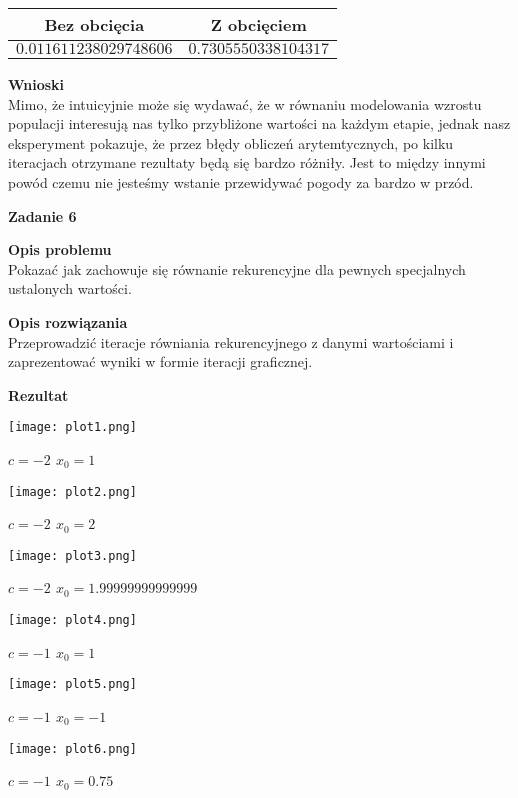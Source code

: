 \documentclass{article}
\begin{document}
\begin{center}
	\begin{tabular}{|c|c|}
		\hline
		Bez obcięcia           & Z obcięciem          \\
		\hline
		$0.011611238029748606$ & $0.7305550338104317$ \\
		\hline
	\end{tabular}
\end{center}

\pagebreak

\noindent \textbf{Wnioski} \\
Mimo, że intuicyjnie może się wydawać, że w równaniu modelowania wzrostu populacji
interesują nas tylko przybliżone wartości na każdym etapie, jednak nasz eksperyment
pokazuje, że przez błędy obliczeń arytemtycznych, po kilku iteracjach otrzymane rezultaty
będą się bardzo różniły. Jest to między innymi powód czemu nie jesteśmy wstanie przewidywać
pogody za bardzo w przód.

\noindent \textbf{\large Zadanie 6}

\noindent \textbf{Opis problemu} \\
Pokazać jak zachowuje się równanie rekurencyjne dla pewnych specjalnych
ustalonych wartości.

\noindent \textbf{Opis rozwiązania} \\
Przeprowadzić iteracje równiania rekurencyjnego z danymi wartościami i
zaprezentować wyniki w formie iteracji graficznej.

\noindent \textbf{Rezultat}

\begin{center}
	\texttt{[image: plot1.png]}

	\textbf{$c=-2$ $x_0=1$}
\end{center}
\begin{center}
	\texttt{[image: plot2.png]}

	\textbf{$c=-2$ $x_0=2$}
\end{center}
\begin{center}
	\texttt{[image: plot3.png]}

  \textbf{$c=-2$ $x_0=1.99999999999999$}
\end{center}
\begin{center}
	\texttt{[image: plot4.png]}

  \textbf{$c=-1$ $x_0=1$}
\end{center}
\begin{center}
	\texttt{[image: plot5.png]}

  \textbf{$c=-1$ $x_0=-1$}
\end{center}
\begin{center}
	\texttt{[image: plot6.png]}

  \textbf{$c=-1$ $x_0=0.75$}
\end{center}
\end{document}
